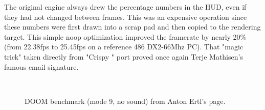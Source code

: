 \par
The original engine always drew the percentage numbers in the HUD, even if they had not changed between frames. This was an expensive operation since these numbers were first drawn into a scrap pad and then copied to the rendering target. This simple noop optimization improved the framerate by nearly 20\% (from 22.38fps to 25.45fps on a reference 486 DX2-66Mhz PC).
That "magic trick" taken directly from "Crispy \doom{}" port proved once again Terje Mathisen's famous email signature.\\
\par
{}\\
\par
\vspace{4mm}

\begin{figure}[H]
\centering  
{}
\caption{DOOM benchmark (mode 9, no sound) from Anton Ertl's \doom{} page.}
\end{figure}
